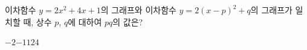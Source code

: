 이차함수 $y=2x^2+4x+1$의 그래프와 이차함수 $y=2(x-p)^2+q$의 그래프가 일치할 때, 상수 $p$, $q$에 대하여 $pq$의 값은?
\begin{choices32}{$-2$}{$-1$}{$1$}{$2$}{$4$}\end{choices32}
